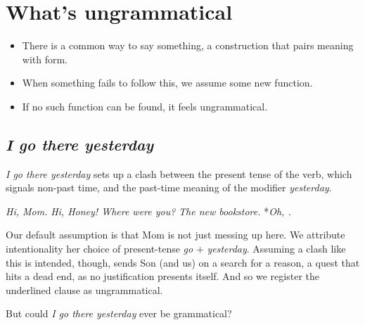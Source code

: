 \chapter{What's ungrammatical}


\begin{itemize}
    \item There is a common way to say something, a construction that pairs meaning with form.
    \item When something fails to follow this, we assume some new function.
    \item If no such function can be found, it feels ungrammatical.
\end{itemize}



\section{\textit{I go there yesterday}}

\textit{I go there yesterday} sets up a clash between the present tense of the verb, which signals non-past time, and the past-time meaning of the modifier \textit{yesterday}.

\ea\label{ex:go-yesterday-clash}
    \begin{dialogue}
         \phantom{..*}\textit{Hi, Mom.}
         \phantom{*}\textit{Hi, Honey! Where were you?}
         \phantom{..*}\textit{The new bookstore.}
         *\textit{Oh, .}
    \end{dialogue}
\z

Our default assumption is that Mom is not just messing up here. We attribute intentionality her choice of present-tense \textit{go} + \textit{yesterday}. Assuming a clash like this is intended, though, sends Son (and us) on a search for a reason, a quest that hits a dead end, as no justification presents itself. And so we register the underlined clause as ungrammatical.


But could \textit{I go there yesterday} ever be grammatical?

